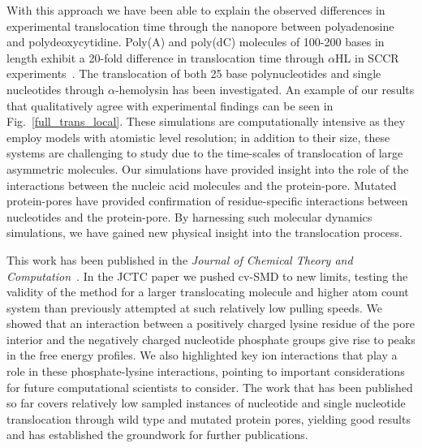 \documentclass[a4paper,10pt]{article}
\newcommand{\ahl}{$\alpha$HL }
\begin{document}
With this approach we have been able to explain the observed differences in experimental translocation time through the nanopore between polyadenosine and polydeoxycytidine. Poly(A) and poly(dC) molecules of 100-200 bases in length exhibit a 20-fold difference in translocation time through \ahl in SCCR experiments~\cite{akeson}. The translocation of both 25 base polynucleotides and single nucleotides through $\alpha$-hemolysin has been investigated. An example of our results that qualitatively agree with experimental findings can be seen in Fig.~\ref{full_trans_local}. These simulations are computationally intensive as they employ models with atomistic level resolution; in addition to their size, these systems are challenging to study due to the time-scales of translocation of large asymmetric molecules. Our simulations have provided insight into the role of the interactions between the nucleic acid molecules and the protein-pore. Mutated protein-pores have provided confirmation of residue-specific interactions between nucleotides and the protein-pore. By harnessing such molecular dynamics simulations, we have gained new physical insight into the translocation process.

This work has been published in the {\em Journal of Chemical Theory and Computation}~\cite{martin-determination}.  In the JCTC paper we pushed cv-SMD to new limits, testing the validity of the method for a larger translocating molecule and higher atom count system than previously attempted at such relatively low pulling speeds. We showed that an interaction between a positively charged lysine residue of the pore interior and the negatively charged nucleotide phosphate groups give rise to peaks in the free energy profiles. We also highlighted key ion interactions that play a role in these phosphate-lysine interactions, pointing to important considerations for future computational scientists to consider. The work that has been published so far covers relatively low sampled instances of nucleotide and single nucleotide translocation through wild type and mutated protein pores, yielding good results and has established the groundwork for further publications. 
\end{document}
